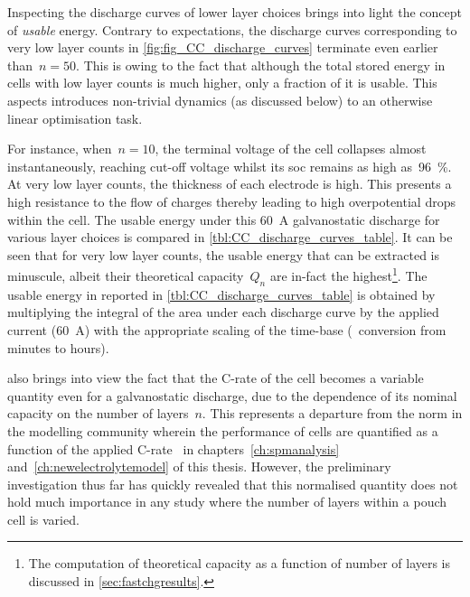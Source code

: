 Inspecting the  discharge curves of  lower layer  choices brings into  light the
concept of \emph{usable} energy. Contrary  to expectations, the discharge curves
corresponding  to very  low layer  counts in  \cref{fig:fig_CC_discharge_curves}
terminate even earlier than~${n=50}$. This is  owing to the fact that although the
total  stored energy  in cells  with low  layer counts  is much  higher, only  a
fraction  of it  is usable.  This  aspects introduces  non-trivial dynamics  (as
discussed below) to an otherwise linear optimisation task.

For  instance,  when~${n  =  10}$,  the terminal  voltage  of  the cell 
collapses almost instantaneously, reaching cut-off  voltage whilst its \gls{soc}
remains as high as~\SI{96}{\percent}. At very low layer  counts, the thickness
of each electrode is high. This presents a high resistance  to the flow of
charges thereby leading to  high overpotential  drops  within the  cell. The 
usable  energy under  this \SI{60}{\ampere} galvanostatic  discharge for various
layer  choices is compared in \cref{tbl:CC_discharge_curves_table}. It can be 
seen that for very low layer counts,  the usable  energy that  can be  extracted
is  minuscule, albeit  their theoretical  capacity~$Q_n$  are  in-fact  the
highest\footnote{The computation of theoretical capacity as a function of number
of layers is discussed in \cref{sec:fastchgresults}.}. The  usable  energy  in
\SI{}{\watthour} reported in \cref{tbl:CC_discharge_curves_table} is obtained by
multiplying the integral  of the area under each discharge  curve by the applied
current  (\SI{60}{\ampere})  with  the  appropriate  scaling  of  the  time-base
(\ie~conversion from minutes to hours).



  also brings  into view  the fact  that the
\mbox{C-rate} of the  cell becomes a variable quantity even  for a galvanostatic
discharge,  due to  the dependence  of  its nominal  capacity on  the number  of
layers~$n$. This represents a departure from the norm in the modelling community
wherein the  performance of cells  are quantified as  a function of  the applied
C-rate  \eg~in  chapters~\ref{ch:spmanalysis} and~\ref{ch:newelectrolytemodel}
of  this thesis.  However, the  preliminary investigation  thus far  has quickly
revealed that  this normalised  quantity does  not hold  much importance  in any
study where the number of layers within a pouch cell is varied.

